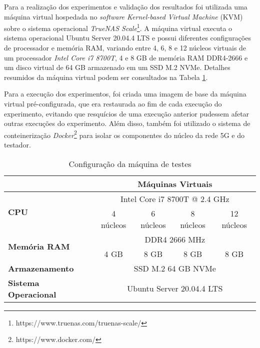 
Para a realização dos experimentos e validação dos resultados foi utilizada uma máquina virtual hospedada no \textit{software Kernel-based Virtual Machine} (KVM) sobre o sistema operacional \textit{TrueNAS Scale}\footnote{https://www.truenas.com/truenas-scale/}.
A máquina virtual executa o sistema operacional Ubuntu Server 20.04.4 LTS e possui diferentes configurações de processador e memória RAM, variando entre 4, 6, 8 e 12 núcleos virtuais de um processador \textit{Intel Core i7 8700T}, 4 e 8 GB de memória RAM DDR4-2666 e um disco virtual de 64 GB armazenado em um SSD M.2 NVMe.
Detalhes resumidos da máquina virtual podem ser consultados na Tabela \ref{tab:vm-config}.

Para a execução dos experimentos, foi criada uma imagem de base da máquina virtual pré-configurada, que era restaurada ao fim de cada execução do experimento, evitando que resquícios de uma execução anterior pudessem afetar outras execuções do experimento.
Além disso, também foi utilizado o sistema de conteinerização \textit{Docker}\footnote{https://www.docker.com/} para isolar os componentes do núcleo da rede 5G e do testador.

\begin{table}[!ht]
\centering
\caption{Configuração da máquina de testes}
\label{tab:vm-config}
\begin{tabular}{|l|cccc|}
\hline
                                      & \multicolumn{4}{c|}{\textbf{Máquinas Virtuais}}    \\ \hline
\multirow{2}{*}{\textbf{CPU}}         & \multicolumn{4}{c|}{Intel Core i7 8700T @ 2.4 GHz} \\ \cline{2-5} 
 & \multicolumn{1}{c|}{4 núcleos} & \multicolumn{1}{c|}{6 núcleos} & \multicolumn{1}{c|}{8 núcleos} & 12 núcleos \\ \hline
\multirow{2}{*}{\textbf{Memória RAM}} & \multicolumn{4}{c|}{DDR4 2666 MHz}                 \\ \cline{2-5} 
 & \multicolumn{1}{c|}{4 GB}      & \multicolumn{1}{c|}{8 GB}      & \multicolumn{1}{c|}{8 GB}      & 8 GB       \\ \hline
\textbf{Armazenamento}                & \multicolumn{4}{c|}{SSD M.2 64 GB NVMe}            \\ \hline
\textbf{Sistema Operacional}          & \multicolumn{4}{c|}{Ubuntu Server 20.04.4 LTS}     \\ \hline
\end{tabular}
\end{table}


